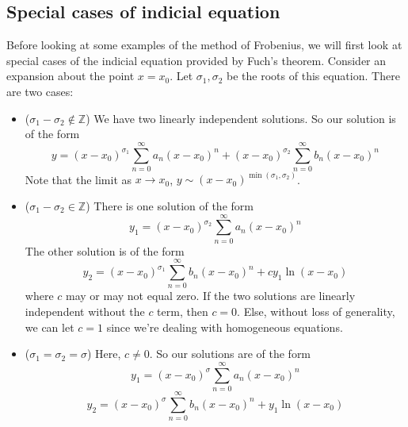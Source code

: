 \subsection{Special cases of indicial equation}
Before looking at some examples of the method of Frobenius, we will first look at special cases of the indicial equation provided by Fuch's theorem.
Consider an expansion about the point \(x=x_0\).
Let \(\sigma_1, \sigma_2\) be the roots of this equation.
There are two cases:
\begin{itemize}
	\item (\(\sigma_1 - \sigma_2 \notin \mathbb Z\)) We have two linearly independent solutions.
	      So our solution is of the form
	      \[
		      y = (x-x_0)^{\sigma_1}\sum_{n=0}^\infty a_n(x-x_0)^n + (x-x_0)^{\sigma_2}\sum_{n=0}^\infty b_n(x-x_0)^n
	      \]
	      Note that the limit as \(x \to x_0\), \(y \sim (x-x_0)^{\min(\sigma_1, \sigma_2)}\).
	\item (\(\sigma_1 - \sigma_2 \in \mathbb Z\)) There is one solution of the form
	      \[
		      y_1 = (x-x_0)^{\sigma_2}\sum_{n=0}^\infty a_n(x-x_0)^n
	      \]
	      The other solution is of the form
	      \[
		      y_2 = (x-x_0)^{\sigma_1}\sum_{n=0}^\infty b_n(x-x_0)^n + cy_1 \ln(x-x_0)
	      \]
	      where \(c\) may or may not equal zero.
	      If the two solutions are linearly independent without the \(c\) term, then \(c=0\).
	      Else, without loss of generality, we can let \(c=1\) since we're dealing with homogeneous equations.
	\item (\(\sigma_1 = \sigma_2 = \sigma\)) Here, \(c \neq 0\).
	      So our solutions are of the form
	      \[
		      y_1 = (x-x_0)^\sigma \sum_{n=0}^\infty a_n(x-x_0)^n
	      \]
	      \[
		      y_2 = (x-x_0)^\sigma \sum_{n=0}^\infty b_n(x-x_0)^n + y_1\ln(x-x_0)
	      \]
\end{itemize}

